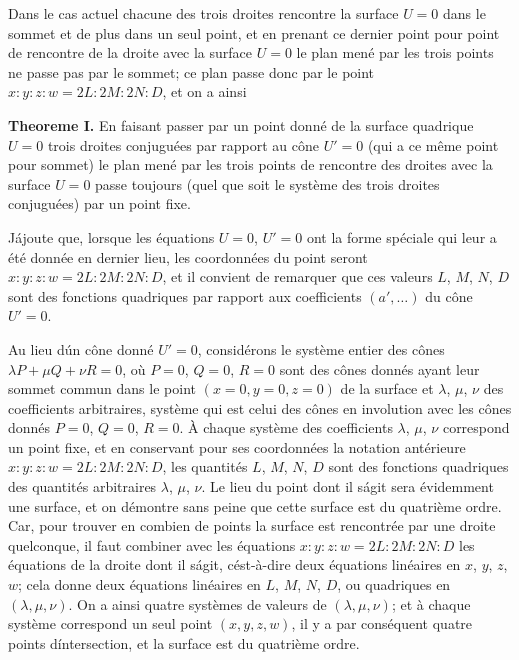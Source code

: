 \documentclass[11pt,a4paper]{article}
\theoremstyle{plain}
\begin{document}
Dans le cas actuel chacune des trois droites rencontre la surface $U=0$ dans le sommet et de plus dans un seul point, et en prenant ce dernier point pour point de rencontre de la droite avec la surface $U=0$ le plan men\'e par les trois points ne passe pas par le sommet; ce plan passe donc par le point $x:y:z:w = 2L:2M:2N:D$, et on a ainsi

\medskip
\noindent\textbf{Theoreme I.} En faisant passer par un point donn\'e de la surface quadrique $U=0$ trois droites conjugu\'ees par rapport au c\^one $U'=0$ (qui a ce m\^eme point pour sommet) le plan men\'e par les trois points de rencontre des droites avec la surface $U=0$ passe toujours (quel que soit le syst\`eme des trois droites conjugu\'ees) par un point fixe.

J\'ajoute que, lorsque les \'equations $U=0$, $U'=0$ ont la forme sp\'eciale qui leur a \'et\'e donn\'ee en dernier lieu, les coordonn\'ees du point seront $x:y:z:w = 2L:2M:2N:D$, et il convient de remarquer que ces valeurs $L$, $M$, $N$, $D$ sont des fonctions quadriques par rapport aux coefficients $(a', \ldots)$ du c\^one $U'=0$.

Au lieu d\'un c\^one donn\'e $U'=0$, consid\'erons le syst\`eme entier des c\^ones $\lambda P + \mu Q + \nu R = 0$, o\`u $P=0$, $Q=0$, $R=0$ sont des c\^ones donn\'es ayant leur sommet commun dans le point $(x=0, y=0, z=0)$ de la surface et $\lambda$, $\mu$, $\nu$ des coefficients arbitraires, syst\`eme qui est celui des c\^ones en involution avec les c\^ones donn\'es $P=0$, $Q=0$, $R=0$. \`A chaque syst\`eme des coefficients $\lambda$, $\mu$, $\nu$ correspond un point fixe, et en conservant pour ses coordonn\'ees la notation ant\'erieure $x:y:z:w = 2L:2M:2N:D$, les quantit\'es $L$, $M$, $N$, $D$ sont des fonctions quadriques des quantit\'es arbitraires $\lambda$, $\mu$, $\nu$. Le lieu du point dont il s\'agit sera \'evidemment une surface, et on d\'emontre sans peine que cette surface est du quatri\`eme ordre. Car, pour trouver en combien de points la surface est rencontr\'ee par une droite quelconque, il faut combiner avec les \'equations $x:y:z:w = 2L:2M:2N:D$ les \'equations de la droite dont il s\'agit, c\'est-\`a-dire deux \'equations lin\'eaires en $x$, $y$, $z$, $w$; cela donne deux \'equations lin\'eaires en $L$, $M$, $N$, $D$, ou quadriques en $(\lambda, \mu, \nu)$. On a ainsi quatre syst\`emes de valeurs de $(\lambda, \mu, \nu)$; et \`a chaque syst\`eme correspond un seul point $(x, y, z, w)$, il y a par cons\'equent quatre points d\'intersection, et la surface est du quatri\`eme ordre.
\end{document}
